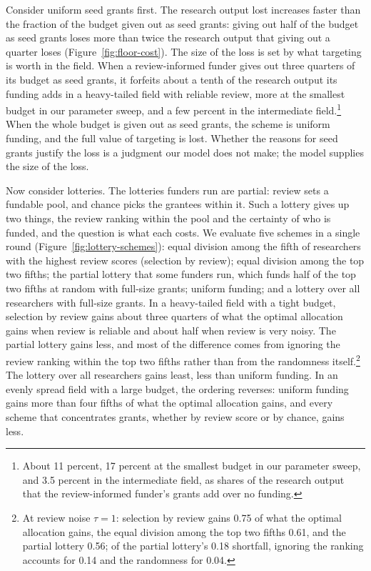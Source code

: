 \documentclass[article, 11pt, reqno]{amsart}
\theoremstyle{named}
\begin{document}
Consider uniform seed grants first. The research output lost increases faster than the fraction of the budget given out as seed grants: giving out half of the budget as seed grants loses more than twice the research output that giving out a quarter loses (Figure~\ref{fig:floor-cost}). The size of the loss is set by what targeting is worth in the field. When a review-informed funder gives out three quarters of its budget as seed grants, it forfeits about a tenth of the research output its funding adds in a heavy-tailed field with reliable review, more at the smallest budget in our parameter sweep, and a few percent in the intermediate field.\footnote{About 11 percent, 17 percent at the smallest budget in our parameter sweep, and 3.5 percent in the intermediate field, as shares of the research output that the review-informed funder's grants add over no funding.} When the whole budget is given out as seed grants, the scheme is uniform funding, and the full value of targeting is lost. Whether the reasons for seed grants justify the loss is a judgment our model does not make; the model supplies the size of the loss.



Now consider lotteries. The lotteries funders run are partial: review sets a fundable pool, and chance picks the grantees within it. Such a lottery gives up two things, the review ranking within the pool and the certainty of who is funded, and the question is what each costs. We evaluate five schemes in a single round (Figure~\ref{fig:lottery-schemes}): equal division among the fifth of researchers with the highest review scores (selection by review); equal division among the top two fifths; the partial lottery that some funders run, which funds half of the top two fifths at random with full-size grants; uniform funding; and a lottery over all researchers with full-size grants. In a heavy-tailed field with a tight budget, selection by review gains about three quarters of what the optimal allocation gains when review is reliable and about half when review is very noisy. The partial lottery gains less, and most of the difference comes from ignoring the review ranking within the top two fifths rather than from the randomness itself.\footnote{At review noise $\tau = 1$: selection by review gains 0.75 of what the optimal allocation gains, the equal division among the top two fifths 0.61, and the partial lottery 0.56; of the partial lottery's 0.18 shortfall, ignoring the ranking accounts for 0.14 and the randomness for 0.04.} The lottery over all researchers gains least, less than uniform funding. In an evenly spread field with a large budget, the ordering reverses: uniform funding gains more than four fifths of what the optimal allocation gains, and every scheme that concentrates grants, whether by review score or by chance, gains less.
\end{document}
